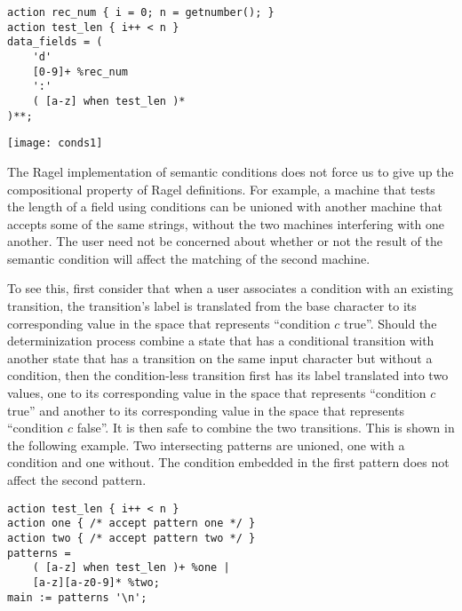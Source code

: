 \documentclass[letterpaper,11pt,oneside]{book}
\newcommand{\graphspace}{\vspace{10pt}}
\newenvironment{inline_code}{\def\baselinestretch{1}\vspace{12pt}\small}{}
\begin{document}
\begin{inline_code}
\begin{verbatim}
action rec_num { i = 0; n = getnumber(); }
action test_len { i++ < n }
data_fields = (
    'd' 
    [0-9]+ %rec_num 
    ':'
    ( [a-z] when test_len )*
)**;
\end{verbatim}
\end{inline_code}

\begin{center}
\texttt{[image: conds1]}
\end{center}
\graphspace

The Ragel implementation of semantic conditions does not force us to give up the
compositional property of Ragel definitions. For example, a machine that tests
the length of a field using conditions can be unioned with another machine
that accepts some of the same strings, without the two machines interfering with
one another. The user need not be concerned about whether or not the result of the
semantic condition will affect the matching of the second machine.

To see this, first consider that when a user associates a condition with an
existing transition, the transition's label is translated from the base character
to its corresponding value in the space that represents ``condition $c$ true''. Should
the determinization process combine a state that has a conditional transition
with another state that has a transition on the same input character but
without a condition, then the condition-less transition first has its label
translated into two values, one to its corresponding value in the space that
represents ``condition $c$ true'' and another to its corresponding value in the
space that represents ``condition $c$ false''. It
is then safe to combine the two transitions. This is shown in the following
example.  Two intersecting patterns are unioned, one with a condition and one
without. The condition embedded in the first pattern does not affect the second
pattern.

\begin{inline_code}
\begin{verbatim}
action test_len { i++ < n }
action one { /* accept pattern one */ }
action two { /* accept pattern two */ }
patterns = 
    ( [a-z] when test_len )+ %one |
    [a-z][a-z0-9]* %two;
main := patterns '\n';
\end{verbatim}
\end{inline_code}
\end{document}
